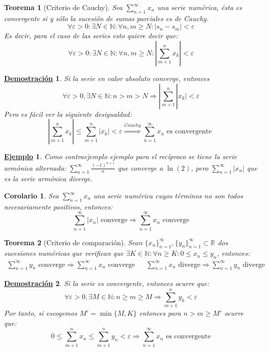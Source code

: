 \documentclass[10pt,a4paper,openright]{book}
\theoremstyle{break}
\newtheorem{theo}{Teorema}[chapter]
\newtheorem{coro}{Corolario}[theo]
\newtheorem*{demo}{\underline{Demostración}}
\newtheorem{ej}{\underline{Ejemplo}}[chapter]
\begin{document}
\begin{theo}[Criterio de Cauchy]
Sea $\sum_{n=1}^{\infty} x_n$ una serie numérica, ésta es convergente si y sólo la sucesión de sumas parciales es de Cauchy.
$$\forall \varepsilon >0 : \exists N\in \mathbb N: \forall n,m\geq N: |s_n-s_m|<\varepsilon$$
Es decir, para el caso de las series esto quiere decir que:
$$\forall \varepsilon >0 : \exists N\in \mathbb N: \forall n,m\geq N: \left|\sum_{m+1}^{n} x_k\right|<\varepsilon$$
\end{theo}
\begin{demo}
Si la serie en valor absoluto converge, entonces
$$\forall \varepsilon > 0, \exists N \in \mathbb{N}: n > m > N \Rightarrow |\sum_{m+1}^{n} |x_k| < \varepsilon$$
Pero es fácil ver la siguiente desigualdad:
$$\left|\sum_{m+1}^{n} x_k\right| \leq \sum_{m+1}^{n} \left|x_k\right|  < \varepsilon \overset{Cauchy}{\Rightarrow} \sum_{n=1}^{\infty} x_n \mbox{ es convergente }$$
\end{demo}

\begin{ej}
Como contraejemplo ejemplo para el recíproco se tiene la serie armónica alternada: $\sum_{n=1}^{\infty} \frac{(-1)^{n+1}}{n}$ que converge a $\ln(2)$, pero $\sum_{n=1}^{\infty} |x_n|$ que es la serie armónica diverge.
\end{ej}

\begin{coro}
\label{coro:convergencia_abs-convergencia}
Sea $\sum_{n=1}^{\infty} x_n$ una serie numérica cuyos términos no son todos necesariamente positivos, entonces:
\[
\sum_{n=1}^{\infty} |x_n|\mbox{ converge}\Rightarrow \sum_{n=1}^{\infty} x_n\mbox{ converge}
\]
\end{coro}

\begin{theo}[Criterio de comparación]
Sean $\{x_n\}_{n=1}^\infty, \{y_n\}_{n=1}^\infty \subset \mathbb{R}$ dos sucesiones numéricas que verifican que $\exists K \in \mathbb{N}: \forall n \geq K : 0 \leq x_n \leq y_n$, entonces:
\begin{align*}
\sum_{n=1}^{\infty} y_n \mbox{ converge} \Rightarrow \sum_{n = 1}^{\infty} x_n \mbox{ converge} & & \sum_{n=1}^{\infty} x_n\mbox{ diverge}\Rightarrow \sum_{n = 1}^{\infty} y_n \mbox{ diverge}
\end{align*}
\end{theo}
\begin{demo}
Si la serie es convergente, entonces ocurre que:
$$\forall \varepsilon > 0, \exists M \in \mathbb{N}: n \geq m \geq M \Rightarrow \sum_{m+1}^{n} y_k	< \varepsilon$$
Por tanto, si escogemos $M'=\min\{M,K\}$ entonces para $n>m\geq M'$ ocurre que:
$$0 \leq \sum_{m+1}^{n} x_n \leq \sum_{m+1}^{n} y_n < \varepsilon \Rightarrow \sum_{n=1}^{\infty} x_n\mbox{ es convergente}$$
\end{demo}
\end{document}
